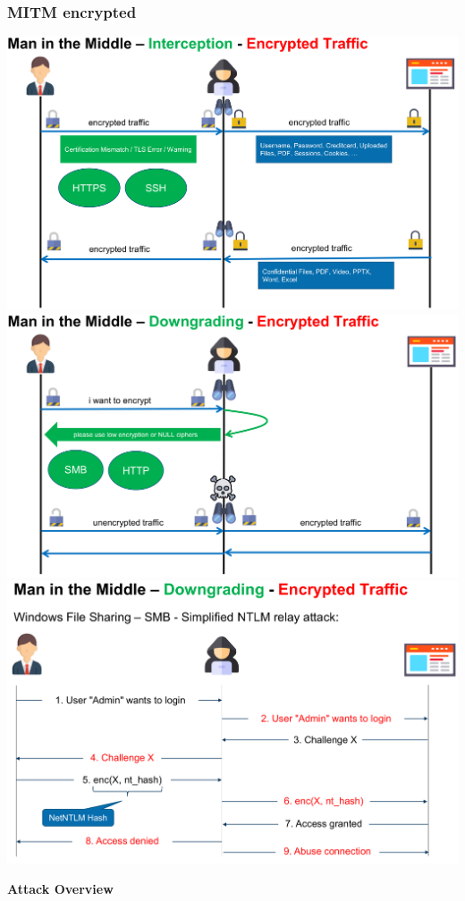 \subsubsection{MITM encrypted}
\begin{center}
\includegraphics[width=\textwidth]{resources/07-mitm-interception-encrypted.png}
\includegraphics[width=\textwidth]{resources/07-mitm-interception-encrypted-1.png}
\includegraphics[width=\textwidth]{resources/07-mitm-interception-encrypted-2.png}
\end{center}
\textbf{Attack Overview}

